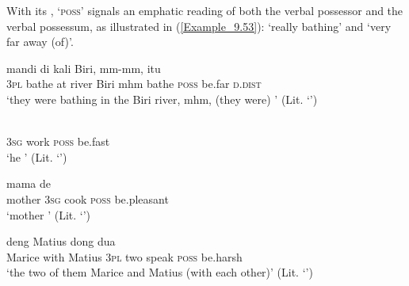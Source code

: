 With its ,  ‘\textsc{poss}’ signals an emphatic reading of both the verbal possessor and the verbal possessum, as illustrated in (\ref{Example_9.53}):  ‘really bathing’ and  ‘very far away (of)’.


\ea
\label{Example_9.53}
 {mandi} {di} {kali} {Biri,} {mm-mm,} {} {} {} {itu}\\ %
 \textsc{3pl}  bathe  at  river  Biri  mhm  bathe  \textsc{poss}  be.far  \textsc{d.dist}\\
 ‘they were bathing in the Biri river, mhm, (they were) ’ (Lit. ‘’) \textstyleExampleSource{[081025-008-Cv.0032-0033]}
\z

\ea
\label{Example_9.54}
 {} {} {}\\ %
 \textsc{3sg}  work  \textsc{poss}  be.fast\\
\glt 
‘he ’ (Lit. ‘’) \textstyleExampleSource{[Elicited BR111020.022]}
\z

\ea
\label{Example_9.55}
\gll  mama  de      \\
 mother  \textsc{3sg}  cook  \textsc{poss}  be.pleasant\\
\glt 
‘mother ’ (Lit. ‘’) \textstyleExampleSource{[Elicited BR111020.023]}
\z

\ea
\label{Example_9.56}
 {deng} {Matius} {dong} {dua} {} {} {}\\ %
 Marice  with  Matius  \textsc{3pl}  two  speak  \textsc{poss}  be.harsh\\
\glt
‘the two of them Marice and Matius  (with each other)’ (Lit. ‘’) \textstyleExampleSource{[Elicited BR111020.024]}
\z


